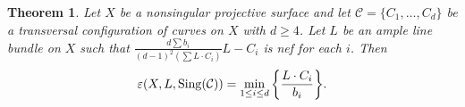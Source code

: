 \documentclass[12pt,reqno]{amsart}
\theoremstyle{plain}
\numberwithin{equation}{section}
\newtheorem{theorem}{Theorem}[section]
\theoremstyle{definition}
\begin{document}
 
	



	
 
	\begin{theorem}
		\label{main-theorem} Let $X$ be a nonsingular projective surface and let $\mathcal{C} = \{C_{1}, \ldots, C_{d}\}$ be a transversal configuration of curves on $X$ with $d \geq 4$. 
		Let $L$ be an ample line bundle on $X$
		such that  $\frac{d\sum b_i}{(d-1)^2(\sum L\cdot C_i)}L-C_i$ is nef for each $i$.   Then 
		$$\varepsilon(X, L,{\rm Sing}(\mathcal{C})) = \min_{1\le i\le d}
  {\left\{\frac{L\cdot C_i}{b_i}\right\}}.$$
	\end{theorem}
\end{document}
